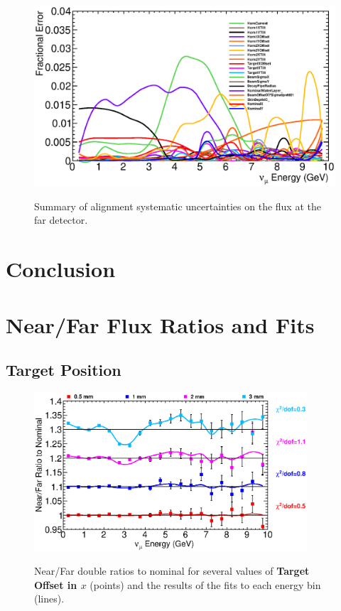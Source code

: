 \begin{figure}[ht]
  \begin{center}
    {\includegraphics[width=6.0in]{figures/error_summary_far.eps}}
  \end{center}
\caption{ Summary of alignment systematic uncertainties on the flux at the far detector.}
\end{figure}


\section{Conclusion}

\appendix
\section{Near/Far Flux Ratios and Fits}
\label{app:nof_plots}

\subsection{Target Position}

\begin{figure}[ht]
  \begin{center}
    {\includegraphics[width=4.0in]{figures/TargetXOffset_nof_summary.eps}}
  \end{center}
\caption{ Near/Far double ratios to nominal for several values of {\bf Target Offset in $x$} (points) and the results of the fits to each energy bin (lines).}
\end{figure}

